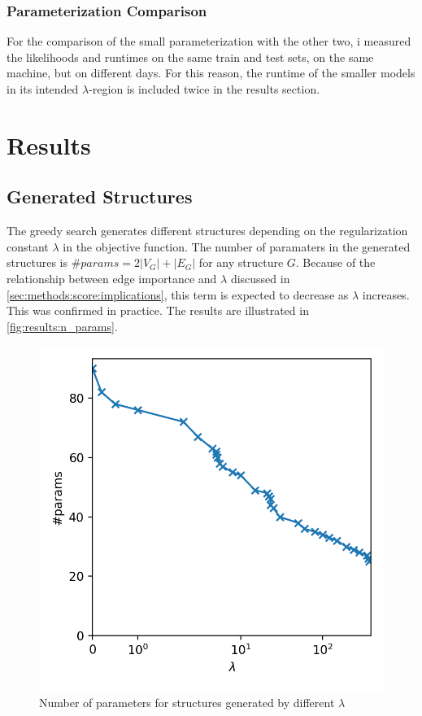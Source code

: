 \documentclass[sigconf, fleqn, prologue, dvipsnames]{acmart}
\newcommand{\abs}[1]{\left\vert #1 \right\vert}
\begin{document}
\subsubsection{Parameterization Comparison}
For the comparison of the small parameterization with the other two, i measured the likelihoods and runtimes on the same train and test sets, on the same machine, but on different days.
For this reason, the runtime of the smaller models in its intended $\lambda$-region is included twice in the results section.


\section{Results}
\subsection{Generated Structures}
\label{sec:results:structures}
The greedy search generates different structures depending on the regularization constant $\lambda$ in the objective function.
The number of paramaters in the generated structures is $\#params = 2 \abs{V_G} + \abs{E_G}$ for any structure $G$.
Because of the relationship between edge importance and $\lambda$ discussed in \autoref{sec:methods:score:implications}, this term is expected to decrease as $\lambda$ increases.
This was confirmed in practice. The results are illustrated in \autoref{fig:results:n_params}.
\begin{figure}
	\centering
	\includegraphics[scale=0.5]{graphics/n_params.png}
	\caption{Number of parameters for structures generated by different $\lambda$}
	\label{fig:results:n_params}
\end{figure}
\end{document}
